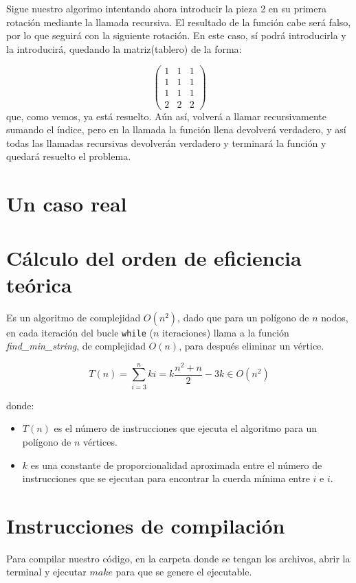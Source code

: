 \documentclass[a4paper, 11pt]{article}
\begin{document}
Sigue nuestro algorimo intentando ahora introducir la pieza 2 en su primera rotación mediante la llamada recursiva. El resultado de la función cabe será falso, por lo que seguirá con la siguiente rotación. En este caso, sí podrá introducirla y la introducirá, quedando la matriz(tablero) de la forma:

\[
\begin{pmatrix}
 1 & 1 & 1 \\
1 & 1 & 1\\
1 & 1 & 1\\
2 & 2 & 2
\end{pmatrix} 
\]
que, como vemos, ya está resuelto. Aún así, volverá a llamar recursivamente sumando el índice, pero en la llamada la función llena devolverá verdadero, y así todas las llamadas recursivas devolverán verdadero y terminará la función y quedará resuelto el problema.


\section{Un caso real}

\section{Cálculo del orden de eficiencia teórica}


Es un algoritmo de complejidad $O(n^2)$, dado que para un polígono de $n$ nodos, en cada iteración del bucle \texttt{while} ($n$ iteraciones) llama a la función \textit{find\_min\_string}, de complejidad $O(n)$, para después eliminar un vértice.

\[
T(n) = \sum_{i=3}^n ki = k\frac{n^2+n}{2} - 3k \in O(n^2)
\]

donde:
\begin{itemize}
\item $T(n)$ es el número de instrucciones que ejecuta el algoritmo para un polígono de $n$ vértices.
\item $k$ es una constante de proporcionalidad aproximada entre el número de instrucciones que se ejecutan para encontrar la cuerda mínima entre $i$ e $i$. 

\end{itemize}

\section{Instrucciones de compilación}

Para compilar nuestro código, en la carpeta donde se tengan los archivos, abrir la terminal y ejecutar $make$ para que se genere el ejecutable.
\end{document}
